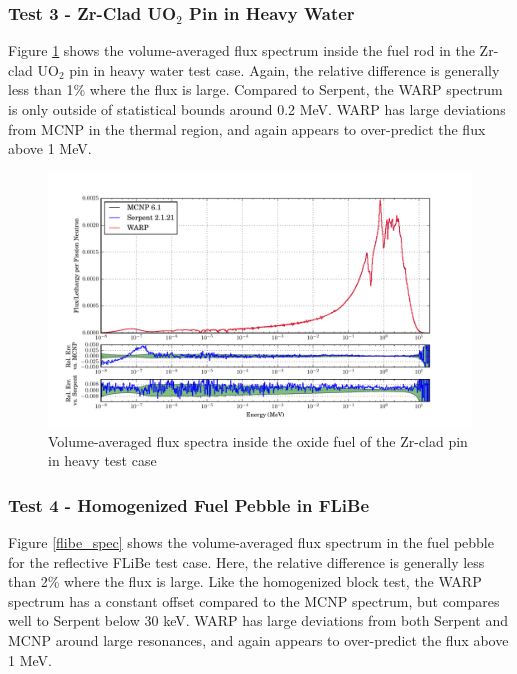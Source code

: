 \documentclass[preprint,12pt]{elsarticle}
\begin{document}
\newpage
\subsubsection{Test 3 - Zr-Clad UO$_2$ Pin in Heavy Water}

Figure \ref{pincell_spec} shows the volume-averaged flux spectrum inside the fuel rod in the Zr-clad UO$_2$ pin in heavy water test case.  Again, the relative difference is generally less than 1\% where the flux is large.  Compared to Serpent, the WARP spectrum is only outside of statistical bounds around 0.2 MeV.   WARP has large deviations from MCNP in the thermal region, and again appears to over-predict the flux above 1 MeV.

\begin{figure}[h!]
\centering
\includegraphics[width=\textwidth,trim= 1cm 0cm 1cm 0cm]{graphics/pincell_spec.pdf}
\caption{Volume-averaged flux spectra inside the oxide fuel of the Zr-clad pin in heavy test case \label{pincell_spec} }
\end{figure}

\newpage
\subsubsection{Test 4 - Homogenized Fuel Pebble in FLiBe}

Figure \ref{flibe_spec} shows the volume-averaged flux spectrum in the fuel pebble for the reflective FLiBe test case.  Here, the relative difference is generally less than 2\% where the flux is large.  Like the homogenized block test, the WARP spectrum has a constant offset compared to the MCNP spectrum, but compares well to Serpent below 30 keV. WARP has large deviations from both Serpent and MCNP around large resonances, and again appears to over-predict the flux above 1 MeV.
\end{document}
